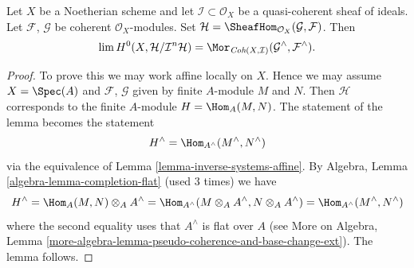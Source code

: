\begin{lemma}
\label{lemma-completion-internal-hom}
Let $X$ be a Noetherian scheme and let $\mathcal{I} \subset \mathcal{O}_X$
be a quasi-coherent sheaf of ideals. Let $\mathcal{F}$, $\mathcal{G}$ be
coherent $\mathcal{O}_X$-modules. Set
$\mathcal{H} = \SheafHom_{\mathcal{O}_X}(\mathcal{G}, \mathcal{F})$.
Then
$$
\lim H^0(X, \mathcal{H}/\mathcal{I}^n\mathcal{H}) =
\Mor_{\textit{Coh}(X, \mathcal{I})}
(\mathcal{G}^\wedge, \mathcal{F}^\wedge).
$$
\end{lemma}

\begin{proof}
To prove this we may work affine locally on $X$.
Hence we may assume $X = \Spec(A)$ and $\mathcal{F}$, $\mathcal{G}$
given by finite $A$-module $M$ and $N$. Then $\mathcal{H}$
corresponds to the finite $A$-module $H = \Hom_A(M, N)$.
The statement of the lemma becomes the statement
$$
H^\wedge = \Hom_{A^\wedge}(M^\wedge, N^\wedge)
$$
via the equivalence of Lemma \ref{lemma-inverse-systems-affine}.
By Algebra, Lemma \ref{algebra-lemma-completion-flat}
(used 3 times) we have
$$
H^\wedge = \Hom_A(M, N) \otimes_A A^\wedge =
\Hom_{A^\wedge}(M \otimes_A A^\wedge, N \otimes_A A^\wedge) =
\Hom_{A^\wedge}(M^\wedge, N^\wedge)
$$
where the second equality uses that $A^\wedge$ is flat over $A$
(see More on Algebra, Lemma
\ref{more-algebra-lemma-pseudo-coherence-and-base-change-ext}).
The lemma follows.
\end{proof}
